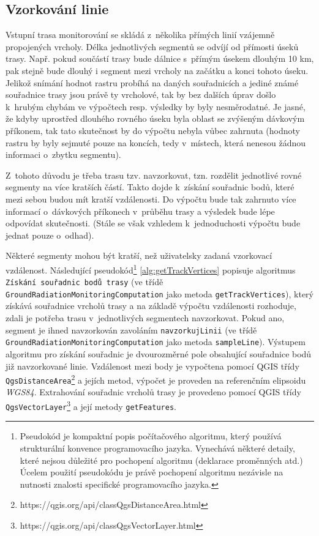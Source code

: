 \subsection{Vzorkování linie}
\label{subsec:vzorkovaniLinie}
Vstupní trasa monitorování se skládá z~několika přímých linií vzájemně propojených vrcholy. Délka jednotlivých segmentů se odvíjí od přímosti úseků trasy. Např. pokud součástí trasy bude dálnice s~přímým úsekem dlouhým 10 km, pak stejně bude dlouhý i segment mezi vrcholy na začátku a konci tohoto úseku. Jelikož snímání hodnot rastru probíhá na daných souřadnicích a jediné známé souřadnice trasy jsou právě ty vrcholové, tak by bez dalších úprav došlo k~hrubým chybám ve výpočtech resp. výsledky by byly nesměrodatné. Je jasné, že kdyby uprostřed dlouhého rovného úseku byla oblast se zvýšeným dávkovým příkonem, tak tato skutečnost by do výpočtu nebyla vůbec zahrnuta (hodnoty rastru by byly sejmuté pouze na koncích, tedy v~místech, která nenesou žádnou informaci o~zbytku segmentu). 

Z~tohoto důvodu je třeba trasu tzv. navzorkovat, tzn. rozdělit jednotlivé rovné segmenty na více kratších částí. Takto dojde k~získání souřadnic bodů, které mezi sebou budou mít kratší vzdálenosti. Do výpočtu bude tak zahrnuto více informací o~dávkových příkonech v~průběhu trasy a výsledek bude lépe odpovídat skutečnosti. (Stále se však vzhledem k~jednoduchosti výpočtu bude jednat pouze o~odhad). 

Některé segmenty mohou být kratší, než uživatelsky zadaná vzorkovací vzdálenost. Následující pseudokód\footnote{Pseudokód je kompaktní popis počítačového algoritmu, který používá strukturální konvence programovacího jazyka. Vynechává některé detaily, které nejsou důležité pro pochopení algoritmu (deklarace proměnných atd.) Úcelem použití pseudokódu je právě pochopení algoritmu nezávisle na nutnosti znalosti specifické programovacího jazyka.\cite{pseudocode}} 
\ref{alg:getTrackVertices} popisuje algoritmus \texttt{Získání souřadnic bodů trasy} (ve třídě \texttt{GroundRadiationMonitoringComputation} jako metoda \texttt{getTrackVertices}), který získává souřadnice vrcholů trasy a na základě výpočtu vzdálenosti rozhoduje, zdali je potřeba trasu v~jednotlivých segmentech navzorkovat. Pokud ano, segment je ihned navzorkován zavoláním \texttt{navzorkujLinii} (ve třídě \texttt{GroundRadiationMonitoringComputation} jako metoda \texttt{sampleLine}). Výstupem algoritmu pro získání souřadnic je dvourozměrné pole obsahující souřadnice bodů již navzorkované linie. Vzdálenost mezi body je vypočtena pomocí QGIS třídy \texttt{QgsDistanceArea}\footnote{https://qgis.org/api/classQgsDistanceArea.html} a jejích metod, výpočet je proveden na referenčním elipsoidu \textit{WGS84}. Extrahování souřadnic vrcholů trasy je provedeno pomocí QGIS třídy \texttt{QgsVectorLayer}\footnote{https://qgis.org/api/classQgsVectorLayer.html} a její metody \texttt{getFeatures}.

